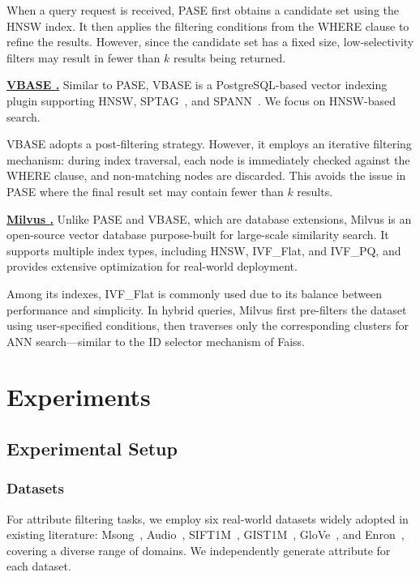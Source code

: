 \documentclass[sigconf, nonacm]{acmart}
\begin{document}
\begin{sloppypar}
When a query request is received, PASE first obtains a candidate set using the HNSW index. It then applies the filtering conditions from the WHERE clause to refine the results. However, since the candidate set has a fixed size, low-selectivity filters may result in fewer than $k$ results being returned.

\vspace{1em}
\noindent\textbf{\underline{VBASE \cite{vbase}.}}  
Similar to PASE, VBASE is a PostgreSQL-based vector indexing plugin supporting HNSW, SPTAG~\cite{sptag}, and SPANN~\cite{spann}. We focus on HNSW-based search.

VBASE adopts a post-filtering strategy. However, it employs an iterative filtering mechanism: during index traversal, each node is immediately checked against the WHERE clause, and non-matching nodes are discarded. This avoids the issue in PASE where the final result set may contain fewer than $k$ results.

\vspace{1em}
\noindent\textbf{\underline{Milvus \cite{milvus}.}}  
Unlike PASE and VBASE, which are database extensions, Milvus is an open-source vector database purpose-built for large-scale similarity search. It supports multiple index types, including HNSW, IVF\_Flat, and IVF\_PQ, and provides extensive optimization for real-world deployment.

Among its indexes, IVF\_Flat is commonly used due to its balance between performance and simplicity. In hybrid queries, Milvus first pre-filters the dataset using user-specified conditions, then traverses only the corresponding clusters for ANN search—similar to the ID selector mechanism of Faiss.

\section{Experiments}
\subsection{Experimental Setup}
\subsubsection{Datasets}

For attribute filtering tasks, we employ six real-world datasets widely adopted in existing literature: Msong~\cite{msong2011}, Audio~\cite{audio_unknown}, SIFT1M~\cite{sift2010}, GIST1M~\cite{sift2010}, GloVe~\cite{GloVe2015}, and Enron~\cite{enron2015}, covering a diverse range of domains. We independently generate attribute for each dataset.



\end{sloppypar}
\end{document}
